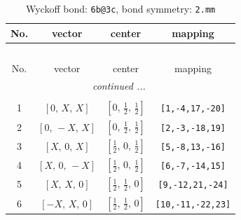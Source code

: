\documentclass[fleqn,8pt]{jsarticle}
\begin{document}
\renewcommand{\arraystretch}{1.2}
\begin{longtable}{cccc}
\caption{Wyckoff bond: {\tt 6b@3c}, bond symmetry: {\tt 2.mm}}
 \\
 \hline \hline
No. & vector & center & mapping \\ \hline \endfirsthead

\multicolumn{3}{l}{\tablename\ \thetable{}} \\
 \hline \hline
No. & vector & center & mapping \\ \hline \endhead

 \hline \hline
\multicolumn{3}{r}{\footnotesize\it continued ...} \\ \endfoot

 \hline \hline
\multicolumn{3}{r}{} \\ \endlastfoot

1 & $\left[ 0,\, X,\, X \right]$ & $\left[ 0,\, \frac{1}{2},\, \frac{1}{2} \right]$ & {\tt [1,-4,17,-20]} \\ \hline
2 & $\left[ 0,\, - X,\, X \right]$ & $\left[ 0,\, \frac{1}{2},\, \frac{1}{2} \right]$ & {\tt [2,-3,-18,19]} \\ \hline
3 & $\left[ X,\, 0,\, X \right]$ & $\left[ \frac{1}{2},\, 0,\, \frac{1}{2} \right]$ & {\tt [5,-8,13,-16]} \\ \hline
4 & $\left[ X,\, 0,\, - X \right]$ & $\left[ \frac{1}{2},\, 0,\, \frac{1}{2} \right]$ & {\tt [6,-7,-14,15]} \\ \hline
5 & $\left[ X,\, X,\, 0 \right]$ & $\left[ \frac{1}{2},\, \frac{1}{2},\, 0 \right]$ & {\tt [9,-12,21,-24]} \\ \hline
6 & $\left[ - X,\, X,\, 0 \right]$ & $\left[ \frac{1}{2},\, \frac{1}{2},\, 0 \right]$ & {\tt [10,-11,-22,23]} \\
\end{longtable}
\renewcommand{\arraystretch}{1.2}
\end{document}
